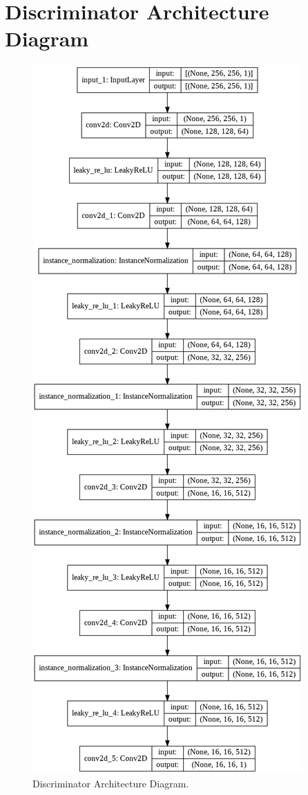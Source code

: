 \section{Discriminator Architecture Diagram}
\begin{figure}[H]
	    \begin{center} \includegraphics[scale=0.35]{images/discriminator.png}
	    \caption{Discriminator Architecture Diagram.}
	    \label{fig:discriminator}
	    \end{center}
\end{figure}




